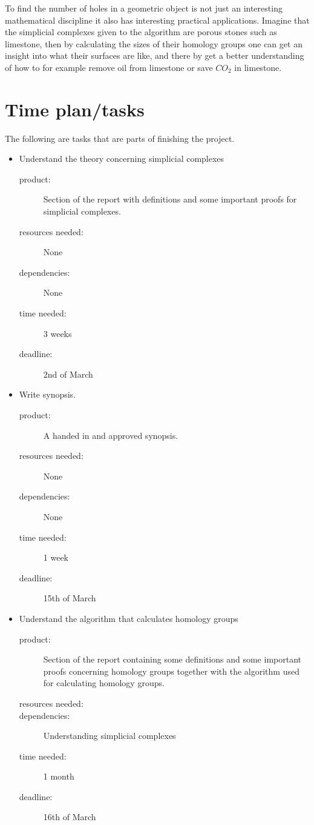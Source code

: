 \documentclass[11pt]{article}
\begin{document}
To find the number of holes in a geometric object is not just an interesting mathematical discipline it also has interesting practical applications. Imagine that the simplicial complexes given to the algorithm are porous stones such as limestone, then by calculating the sizes of their homology groups one can get an insight into what their surfaces are like, and there by get a better understanding of how to for example remove oil from limestone or save $CO_2$ in limestone. 


\section*{Time plan/tasks}
The following are tasks that are parts of finishing the project.
\begin{itemize}
\item Understand the theory concerning simplicial complexes
\begin{description}
\item[product:]Section of the report with definitions and some important proofs for simplicial complexes.
\item[resources needed:]None
\item[dependencies:]None
\item[time needed:]3 weeks
\item[deadline:]2nd of March
\end{description}

\item Write synopsis.
\begin{description}
\item[product:]A handed in and approved synopsis.
\item[resources needed:]None
\item[dependencies:]None
\item[time needed:]1 week
\item[deadline:]15th of March
\end{description}

\item Understand the algorithm that calculates homology groups
\begin{description}
\item[product:]Section of the report containing some definitions and some important proofs concerning homology groups together with the algorithm used for calculating homology groups. 
\item[resources needed:]
\item[dependencies:]Understanding simplicial complexes
\item[time needed:]1 month
\item[deadline:]16th of March
\end{description}


\end{itemize}
\end{document}
